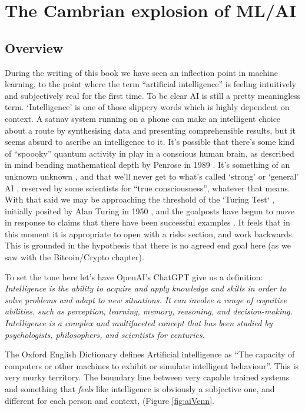 \section{The Cambrian explosion of ML/AI}
\subsection{Overview}
During the writing of this book we have seen an inflection point in machine learning, to the point where the term ``artificial intelligence'' is feeling intuitively and subjectively real for the first time.  To be clear AI is still a pretty meaningless term. `Intelligence' is one of those slippery words which is highly dependent on context. A satnav system running on a phone can make an intelligent choice about a route by synthesising data and presenting comprehensible results, but it seems absurd to ascribe an intelligence to it. It's possible that there's some kind of ``spoooky'' quantum activity in play in a conscious human brain, as described in mind bending mathematical depth by Penrose in 1989 \cite{penrose1990emperor}. It's something of an unknown unknown \cite{kerskens2022experimental}, and that we'll never get to what's called `strong' or `general' AI \cite{larson2021myth, searle1980minds}, reserved by some scientists for ``true consciousness'', whatever that means. With that said we may be approaching the threshold of the `Turing Test` \cite{sep-turing-test}, initially posited by Alan Turing in 1950 \cite{turing1950computing}, and the goalposts have begun to move in response to claims that there have been successful examples \cite{warwick2016can, french2012moving, french2000turing, searle2009turing}. It feels that in this moment it is appropriate to open with a risks section, and work backwards. This is grounded in the hypothesis that there is no agreed end goal here (as we saw with the Bitcoin/Crypto chapter).\par
To set the tone here let's have OpenAI's ChatGPT give us a definition:
\textit{Intelligence is the ability to acquire and apply knowledge and skills in order to solve problems and adapt to new situations. It can involve a range of cognitive abilities, such as perception, learning, memory, reasoning, and decision-making. Intelligence is a complex and multifaceted concept that has been studied by psychologists, philosophers, and scientists for centuries.}\par
The Oxford English Dictionary defines Artificial intelligence as ``The capacity of computers or other machines to exhibit or simulate intelligent behaviour''. This is very murky territory. The boundary line between very capable trained systems and something that \textit{feels} like intelligence is obviously a subjective one, and different for each person and context, (Figure \ref{fig:aiVenn}.\par


